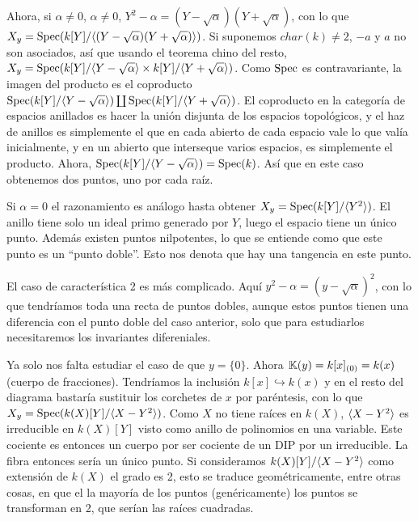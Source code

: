 \documentclass[GA.tex]{subfiles}
\begin{document}
\begin{ej}
 Ahora, si $\alpha\neq 0$, $\alpha\neq 0$, $Y^2-\alpha=(Y-\sqrt{\alpha})(Y+\sqrt{\alpha})$, con lo que $X_y=\operatorname{Spec}(k[Y]/\langle{(Y-\sqrt{\alpha})(Y+\sqrt{\alpha})}\rangle)$. Si suponemos $char(k)\neq 2$, $-a$ y $a$ no son asociados, así que usando el teorema chino del resto, $X_y=\operatorname{Spec}(k[Y]/\langle{Y-\sqrt{\alpha}}\rangle\times k[Y]/\langle{Y+\sqrt{\alpha}}\rangle)$. Como $\operatorname{Spec}$ es contravariante, la imagen del producto es el coproducto $\operatorname{Spec}(k[Y]/\langle{Y-\sqrt{\alpha}}\rangle)\coprod \operatorname{Spec}(k[Y]/\langle{Y+\sqrt{\alpha}}\rangle)$. El coproducto en la categoría de espacios anillados es hacer la unión disjunta de los espacios topológicos, y el haz de anillos es simplemente el que en cada abierto de cada espacio vale lo que valía inicialmente, y en un abierto que interseque varios espacios, es simplemente el producto. Ahora, $\operatorname{Spec}(k[Y]/\langle{Y-\sqrt{\alpha}}\rangle)=\operatorname{Spec}(k)$. Así que en este caso obtenemos dos puntos, uno por cada raíz. 
 
Si $\alpha=0$ el razonamiento es análogo hasta obtener $X_y=\operatorname{Spec}(k[Y]/\langle{Y^2}\rangle)$. El anillo tiene solo un ideal primo generado por $Y$, luego el espacio tiene un único punto. Además existen puntos nilpotentes, lo que se entiende como que este punto es un ``punto doble''. Esto nos denota que hay una tangencia en este punto. 

El caso de característica 2 es más complicado. Aquí $y^2-\alpha=(y-\sqrt{\alpha})^2$, con lo que tendríamos toda una recta de puntos dobles, aunque estos puntos tienen una diferencia con el punto doble del caso anterior, solo que para estudiarlos necesitaremos los invariantes difereniales.

Ya solo nos falta estudiar el caso de que $y=\{0\}$. Ahora $\mathbb{K}(y)=k[x]_{(0)}=k(x)$ (cuerpo de fracciones). Tendríamos la inclusión $k[x]\hookrightarrow k(x)$ y en el resto del diagrama bastaría sustituir los corchetes de $x$ por paréntesis, con lo que $X_y=\operatorname{Spec}(k(X)[Y]/\langle{X-Y^2}\rangle)$. Como $X$ no tiene raíces en $k(X)$, $\langle{X-Y^2}\rangle$ es irreducible en $k(X)[Y]$ visto como anillo de polinomios en una variable. Este cociente es entonces un cuerpo por ser cociente de un DIP por un irreducible. La fibra entonces sería un único punto. Si consideramos $k(X)[Y]/\langle{X-Y^2}\rangle$ como extensión de $k(X)$ el grado es 2, esto se traduce geométricamente, entre otras cosas, en que el la mayoría de los puntos (genéricamente) los puntos se transforman en 2, que serían las raíces cuadradas.
\end{ej}
\end{document}
